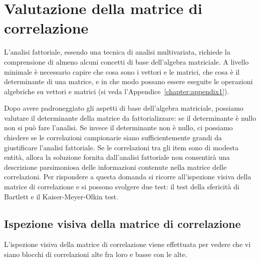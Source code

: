 \chapter{Valutazione della matrice di correlazione}
\label{ch:val_matrici}


L'analisi fattoriale, essendo una tecnica di analisi multivariata, richiede la comprensione di almeno alcuni concetti di base dell'algebra matriciale. A livello minimale è necessario capire che cosa sono i vettori e le matrici, che cosa è il determinante di una matrice, e in che modo possano essere eseguite le operazioni algebriche su vettori e matrici (si veda l'Appendice~\ref{chapter:appendix1}). 

Dopo avere padroneggiato gli aspetti di base dell'algebra matriciale, possiamo valutare il determinante della matrice da fattorializzare: se il determinante è nullo non si può fare l'analisi. Se invece il determinante non è nullo, ci possiamo chiedere se le correlazioni campionarie siano sufficientemente grandi da giustificare l'analisi fattoriale.  Se le correlazioni tra gli item sono di modesta entità, allora la soluzione fornita dall'analisi fattoriale non consentirà una descrizione parsimoniosa delle informazioni contenute nella matrice delle correlazioni. Per rispondere a questa domanda si ricorre all'ispezione visiva della matrice di correlazione e si possono svolgere due test: il test della sfericità di Bartlett e il Kaiser-Meyer-Olkin test.

\section{Ispezione visiva della matrice di correlazione}

L'ispezione visiva della matrice di correlazione viene effettuata per vedere che
vi siano blocchi di correlazioni alte fra loro e basse con le alte. 



